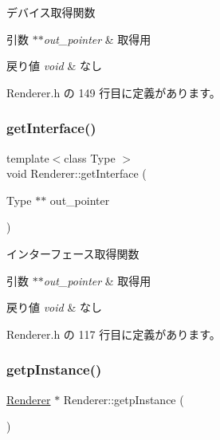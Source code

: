 デバイス取得関数 


\begin{DoxyParams}{引数}
{\em $\ast$$\ast$out\+\_\+pointer} & 取得用 \\
\hline
\end{DoxyParams}

\begin{DoxyRetVals}{戻り値}
{\em void} & なし \\
\hline
\end{DoxyRetVals}


 Renderer.\+h の 149 行目に定義があります。

\mbox{\label{class_renderer_ae7155d5c9df23afd21082c08931a2e72}} 
\subsubsection{\texorpdfstring{get\+Interface()}{getInterface()}}
{\footnotesize\ttfamily template$<$class Type $>$ \\
void Renderer\+::get\+Interface (\begin{DoxyParamCaption}\item[{Type $\ast$$\ast$}]{out\+\_\+pointer }\end{DoxyParamCaption})\hspace{0.3cm}{\ttfamily [inline]}}



インターフェース取得関数 


\begin{DoxyParams}{引数}
{\em $\ast$$\ast$out\+\_\+pointer} & 取得用 \\
\hline
\end{DoxyParams}

\begin{DoxyRetVals}{戻り値}
{\em void} & なし \\
\hline
\end{DoxyRetVals}


 Renderer.\+h の 117 行目に定義があります。

\mbox{\label{class_renderer_a995648604452c47b494de005b30de863}} 
\subsubsection{\texorpdfstring{getp\+Instance()}{getpInstance()}}
{\footnotesize\ttfamily \mbox{\hyperlink{class_renderer}{Renderer}} $\ast$ Renderer\+::getp\+Instance (\begin{DoxyParamCaption}{ }\end{DoxyParamCaption})\hspace{0.3cm}{\ttfamily [static]}}



